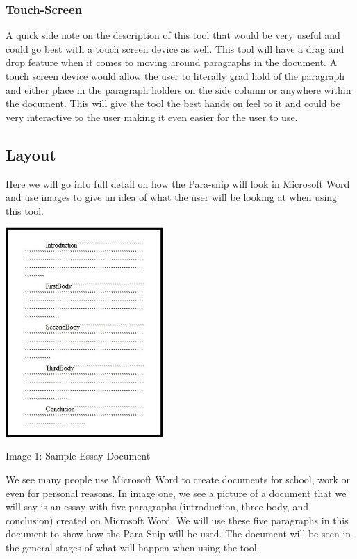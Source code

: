 \documentclass{article}
\begin{document}
\subsubsection{Touch-Screen}
	A quick side note on the description of this tool that would be very useful and could go best with a touch screen device as well. This tool will have a drag and drop feature when it comes to moving around paragraphs in the document. A touch screen device would allow the user to literally grad hold of the paragraph and either place in the paragraph holders on the side column or anywhere within the document. This will give the tool the best hands on feel to it and could be very interactive to the user making it even easier for the user to use.
	
\subsection{Layout}
	Here we will go into full detail on how the Para-snip will look in Microsoft Word and use images to give an idea of what the user will be looking at when using this tool.

\begin{center}
\includegraphics[width=60mm]{BeginEssay.jpg}
\end{center}
\begin{center}
Image 1: Sample Essay Document
\end{center}
	
	We see many people use Microsoft Word to create documents for school, work or even for personal reasons. In image one, we see a picture of a document that we will say is an essay with five paragraphs (introduction, three body, and conclusion) created on Microsoft Word. We will use these five paragraphs in this document to show how the Para-Snip will be used. The document will be seen in the general stages of what will happen when using the tool.
	
\end{document}
